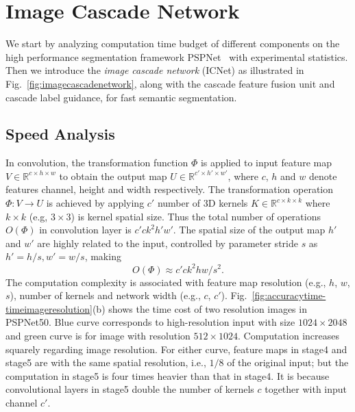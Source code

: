 \documentclass[runningheads]{llncs}
\begin{document}
\section{Image Cascade Network}
We start by analyzing computation time budget of different components on the high performance segmentation framework PSPNet~\cite{zhao2017pspnet} with experimental statistics. Then we introduce the \textit{image cascade network} (ICNet) as illustrated in Fig.~\ref{fig:imagecascadenetwork}, along with the cascade feature fusion unit and cascade label guidance, for fast semantic segmentation.

\subsection{Speed Analysis}\label{sec:speed}
In convolution, the transformation function $\varPhi$ is applied to input feature map $V \in \mathbb{R}^{c \times h \times w}$ to obtain the output map $U \in \mathbb{R}^{c' \times h' \times w'}$, where $c$, $h$ and $w$ denote features channel, height and width respectively.
The transformation operation $\varPhi: V \rightarrow U$ is achieved by applying $c'$ number of 3D kernels $K \in \mathbb{R}^{c \times k \times k}$ where $k \times k$ (e.g, $3 \times 3$) is kernel spatial size.
Thus the total number of operations $O(\varPhi)$ in convolution layer is $c'ck^{2}h'w'$. The spatial size of the output map $h'$ and $w'$ are highly related to the input, controlled by parameter stride $s$ as $h'=h/s, w'=w/s$, making 
\begin{equation}\label{eq:time}
	O(\varPhi) \approx c'ck^{2}hw/s^{2}.
\end{equation}
The computation complexity is associated with feature map resolution (e.g., $h$, $w$, $s$), number of kernels and network width (e.g., $c$, $c'$). Fig.~\ref{fig:accuracytime-timeimageresolution}(b) shows the time cost of two resolution images in PSPNet50. Blue curve corresponds to high-resolution input with size $1024 \times 2048$ and green curve is for image with resolution $512 \times 1024$. Computation increases squarely regarding image resolution. For either curve, feature maps in stage4 and stage5 are with the same spatial resolution, i.e., $1/8$ of the original input; but the computation in stage5 is four times heavier than that in stage4. It is because convolutional layers in stage5 double the number of kernels $c$ together with input channel $c'$.
\end{document}
